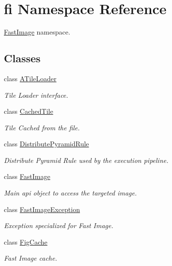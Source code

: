 \hypertarget{namespacefi}{}\section{fi Namespace Reference}
\label{namespacefi}


\hyperlink{classfi_1_1FastImage}{Fast\+Image} namespace.  


\subsection*{Classes}
\begin{DoxyCompactItemize}
\item 
class \hyperlink{classfi_1_1ATileLoader}{A\+Tile\+Loader}
\begin{DoxyCompactList}\small\item\em Tile Loader interface. \end{DoxyCompactList}\item 
class \hyperlink{classfi_1_1CachedTile}{Cached\+Tile}
\begin{DoxyCompactList}\small\item\em Tile Cached from the file. \end{DoxyCompactList}\item 
class \hyperlink{classfi_1_1DistributePyramidRule}{Distribute\+Pyramid\+Rule}
\begin{DoxyCompactList}\small\item\em Distribute Pyramid Rule used by the execution pipeline. \end{DoxyCompactList}\item 
class \hyperlink{classfi_1_1FastImage}{Fast\+Image}
\begin{DoxyCompactList}\small\item\em Main api object to access the targeted image. \end{DoxyCompactList}\item 
class \hyperlink{classfi_1_1FastImageException}{Fast\+Image\+Exception}
\begin{DoxyCompactList}\small\item\em Exception specialized for Fast Image. \end{DoxyCompactList}\item 
class \hyperlink{classfi_1_1FigCache}{Fig\+Cache}
\begin{DoxyCompactList}\small\item\em Fast Image cache. \end{DoxyCompactList}\item 

\end{DoxyCompactItemize}
